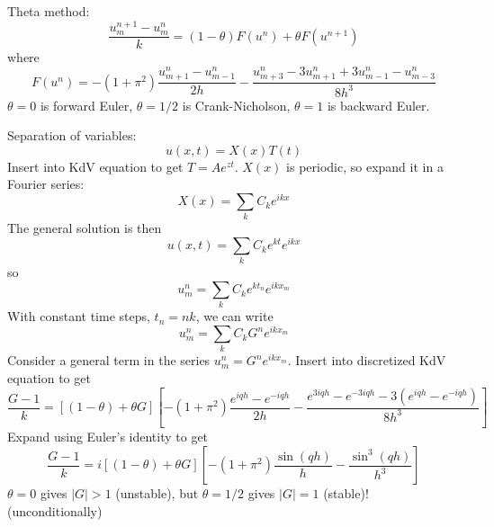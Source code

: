 Theta method:
\begin{equation}
\frac{u_m^{n+1} - u_m^n}{k} = (1-\theta) F(u^n) + \theta F(u^{n+1})
\end{equation}
where
\begin{equation}
F(u^n) = -(1+\pi^2) \frac{u_{m+1}^n-u_{m-1}^n}{2h} - \frac{u_{m+3}^n-3u_{m+1}^n+3u_{m-1}^n-u_{m-3}^n}{8h^3}
\end{equation}
$\theta = 0$ is forward Euler, $\theta = 1/2$ is Crank-Nicholson, $\theta = 1$ is backward Euler.

Separation of variables:
\begin{equation}
u(x, t) = X(x) T(t)
\end{equation}
Insert into KdV equation to get $T = A e^{zt}$.
$X(x)$ is periodic, so expand it in a Fourier series:
\begin{equation}
X(x) = \sum_k C_k e^{ikx}
\end{equation}
The general solution is then
\begin{equation}
u(x, t) = \sum_k C_k e^{kt} e^{ikx}
\end{equation}
so
\begin{equation}
u_m^n = \sum_k C_k e^{kt_n} e^{ikx_m}
\end{equation}
With constant time steps, $t_n = nk$, we can write
\begin{equation}
u_m^n = \sum_k C_k G^n e^{ikx_m}
\end{equation}
Consider a general term in the series $u_m^n = G^n e^{ikx_m}$. Insert into discretized KdV equation to get
\begin{equation}
\frac{G-1}{k} = [(1-\theta)+\theta G] [-(1+\pi^2) \frac{e^{iqh}-e^{-iqh}}{2h} - \frac{e^{3iqh}-e^{-3iqh}-3(e^{iqh}-e^{-iqh})}{8h^3}]
\end{equation}
Expand using Euler's identity to get
\begin{equation}
\frac{G-1}{k} = i [(1-\theta)+\theta G] [-(1+\pi^2) \frac{\sin(qh)}{h} - \frac{\sin^3(qh)}{h^3}]
\end{equation}
$\theta = 0$ gives $|G| > 1$ (unstable), but $\theta = 1/2$ gives $|G| = 1$ (stable)! (unconditionally)

